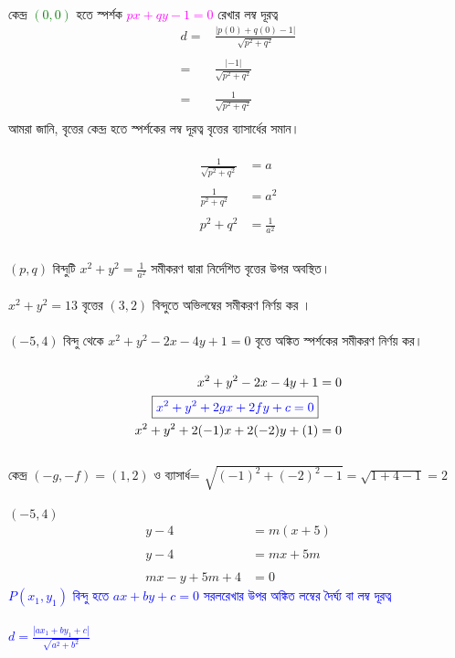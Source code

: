 \documentclass{article}
\begin{document}
\\
কেন্দ্র \textcolor{green}{$(0,0)$} হতে স্পর্শক \textcolor{magenta}{$px+qy-1=0$}  রেখার লম্ব দূরত্ব \\
\begin{align*}
	d=	&\frac{|p(0)+q(0)-1|}{\sqrt{p^2+q^2}}\\
	\\
	=	&	\frac{|-1|}{\sqrt{p^2+q^2}}\\
	\\
	=	&	\frac{1}{\sqrt{p^2+q^2}}\\
\end{align*}
আমরা জানি, বৃত্তের কেন্দ্র হতে স্পর্শকের লম্ব দূরত্ব বৃত্তের ব্যাসার্ধের সমান। \\
\\ 
\begin{align*}
	\frac{1}{\sqrt{p^2+q^2}}&=a\\
	\\
\frac{1}{p^2+q^2}&=a^2\\
	\\
	p^2+q^2&= \frac{1}{a^2}\\
\end{align*}
\\ 
$(p,q)$ বিন্দুটি  $x^2+y^2=\frac{1}{a^2}$ সমীকরণ দ্বারা নির্দেশিত বৃত্তের উপর অবস্থিত।\\
\\ 
$x^2+y^2=13$ বৃত্তের $(3,2)$ বিন্দুতে অভিলম্বের সমীকরণ নির্ণয় কর । \\
\\
$(-5,4)$ বিন্দু থেকে $x^2+y^2-2x-4y+1=0$ বৃত্তে অঙ্কিত স্পর্শকের সমীকরণ নির্ণয় কর। \\ 
\\ 
	\begin{align*}
	x^2+y^2-2x-4y+1&=0\\
		\boxed{\textcolor{blue}{x^2+y^2+2gx+2fy+c=0}}&\\
	x^2+y^2+2(-1)x+2(-2)y+(1)&=0
	\end{align*}
	\\
	কেন্দ্র 	$(-g,-f)=(1,2)$ ও ব্যাসার্ধ= $\sqrt{(-1)^2+(-2)^2-1}=\sqrt{1+4-1}=2$\\
	\\ 
	$(-5,4)$
\begin{align*}
	y-4&=m(x+5)\\
	\\
	y-4&=mx+5m\\
	\\
	mx-y+5m+4&=0
\end{align*}
	\textcolor{blue}{$P(x_1,y_1)$ বিন্দু হতে  $ax+by+c=0$ সরলরেখার উপর অঙ্কিত লম্বের দৈর্ঘ্য বা লম্ব দূরত্ব \\
		\\
		$d=\frac{|ax_1+by_1+c|}{\sqrt{a^2+b^2}}$}\\
\end{document}
